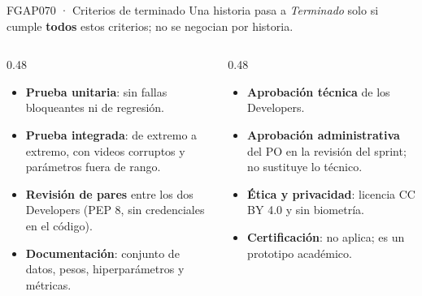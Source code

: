 \documentclass[aspectratio=169,11pt]{beamer}
\begin{document}
\begin{frame}{FGAP070 · Criterios de terminado}
\small
Una historia pasa a \textit{Terminado} solo si cumple \textbf{todos} estos criterios; no se negocian por historia.\\[8pt]
\begin{columns}[T]
\begin{column}{0.48\textwidth}
\begin{itemize}\setlength{\itemsep}{6pt}
  \item \textbf{Prueba unitaria}: sin fallas bloqueantes ni de regresión.
  \item \textbf{Prueba integrada}: de extremo a extremo, con videos corruptos y parámetros fuera de rango.
  \item \textbf{Revisión de pares} entre los dos Developers (PEP 8, sin credenciales en el código).
  \item \textbf{Documentación}: conjunto de datos, pesos, hiperparámetros y métricas.
\end{itemize}
\end{column}
\begin{column}{0.48\textwidth}
\begin{itemize}\setlength{\itemsep}{6pt}
  \item \textbf{Aprobación técnica} de los Developers.
  \item \textbf{Aprobación administrativa} del PO en la revisión del sprint; no sustituye lo técnico.
  \item \textbf{Ética y privacidad}: licencia CC BY 4.0 y sin biometría.
  \item \textbf{Certificación}: no aplica; es un prototipo académico.
\end{itemize}
\end{column}
\end{columns}
\end{frame}
\end{document}
